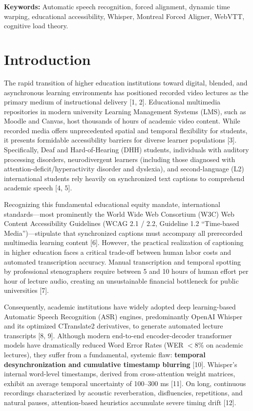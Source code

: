 \documentclass[12pt,a4paper]{article}
\begin{document}
\noindent \textbf{Keywords:} Automatic speech recognition, forced alignment, dynamic time warping, educational accessibility, Whisper, Montreal Forced Aligner, WebVTT, cognitive load theory.

\vspace{0.5cm}

\section{Introduction}
The rapid transition of higher education institutions toward digital, blended, and asynchronous learning environments has positioned recorded video lectures as the primary medium of instructional delivery [1, 2]. Educational multimedia repositories in modern university Learning Management Systems (LMS), such as Moodle and Canvas, host thousands of hours of academic video content. While recorded media offers unprecedented spatial and temporal flexibility for students, it presents formidable accessibility barriers for diverse learner populations [3]. Specifically, Deaf and Hard-of-Hearing (DHH) students, individuals with auditory processing disorders, neurodivergent learners (including those diagnosed with attention-deficit/hyperactivity disorder and dyslexia), and second-language (L2) international students rely heavily on synchronized text captions to comprehend academic speech [4, 5].

Recognizing this fundamental educational equity mandate, international standards---most prominently the World Wide Web Consortium (W3C) Web Content Accessibility Guidelines (WCAG 2.1 / 2.2, Guideline 1.2 ``Time-based Media'')---stipulate that synchronized captions must accompany all prerecorded multimedia learning content [6]. However, the practical realization of captioning in higher education faces a critical trade-off between human labor costs and automated transcription accuracy. Manual transcription and temporal spotting by professional stenographers require between 5 and 10 hours of human effort per hour of lecture audio, creating an unsustainable financial bottleneck for public universities [7].

Consequently, academic institutions have widely adopted deep learning-based Automatic Speech Recognition (ASR) engines, predominantly OpenAI Whisper and its optimized CTranslate2 derivatives, to generate automated lecture transcripts [8, 9]. Although modern end-to-end encoder-decoder transformer models have dramatically reduced Word Error Rates (WER $< 8\%$ on academic lectures), they suffer from a fundamental, systemic flaw: \textbf{temporal desynchronization and cumulative timestamp blurring} [10]. Whisper's internal word-level timestamps, derived from cross-attention weight matrices, exhibit an average temporal uncertainty of 100--300 ms [11]. On long, continuous recordings characterized by acoustic reverberation, disfluencies, repetitions, and natural pauses, attention-based heuristics accumulate severe timing drift [12].
\end{document}
